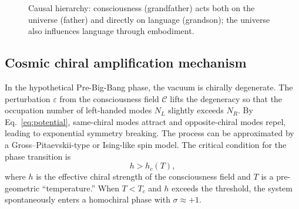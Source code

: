 \documentclass[10pt,a4paper]{article}
\begin{document}
\begin{figure}[htbp]
\centering
{}
\caption{Causal hierarchy: consciousness (grandfather) acts both on the universe (father) and directly on language (grandson); the universe also influences language through embodiment.}
\label{fig:hierarchy}
\end{figure}

\subsection*{Cosmic chiral amplification mechanism}
In the hypothetical Pre-Big-Bang phase, the vacuum is chirally degenerate. The perturbation $\varepsilon$ from the consciousness field $\mathcal{C}$ lifts the degeneracy so that the occupation number of left-handed modes $N_L$ slightly exceeds $N_R$. By Eq.~\eqref{eq:potential}, same-chiral modes attract and opposite-chiral modes repel, leading to exponential symmetry breaking. The process can be approximated by a Gross--Pitaevskii-type or Ising-like spin model. The critical condition for the phase transition is
\begin{equation}
h > h_c(T),
\end{equation}
where $h$ is the effective chiral strength of the consciousness field and $T$ is a pre-geometric ``temperature.'' When $T<T_c$ and $h$ exceeds the threshold, the system spontaneously enters a homochiral phase with $\sigma\approx +1$.
\end{document}
